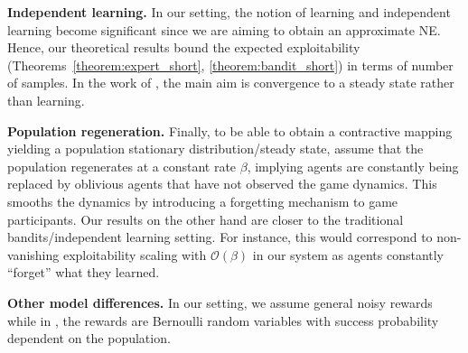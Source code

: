 \textbf{Independent learning.}
In our setting, the notion of learning and independent learning become significant since we are aiming to obtain an approximate NE.
Hence, our theoretical results bound the expected exploitability (Theorems~\ref{theorem:expert_short}, \ref{theorem:bandit_short}) in terms of number of samples.
In the work of \cite{gummadi2013mean}, the main aim is convergence to a steady state rather than learning.

\textbf{Population regeneration.}
Finally, to be able to obtain a contractive mapping yielding a population stationary distribution/steady state, \cite{gummadi2013mean} assume that the population regenerates at a constant rate $\beta$, implying agents are constantly being replaced by oblivious agents that have not observed the game dynamics.
This smooths the dynamics by introducing a forgetting mechanism to game participants.
Our results on the other hand are closer to the traditional bandits/independent learning setting.
For instance, this would correspond to non-vanishing exploitability scaling with $\mathcal{O}(\beta)$ in our system as agents constantly ``forget'' what they learned.

\textbf{Other model differences.}
In our setting, we assume general noisy rewards while in \cite{gummadi2013mean}, the rewards are Bernoulli random variables with success probability dependent on the population.
